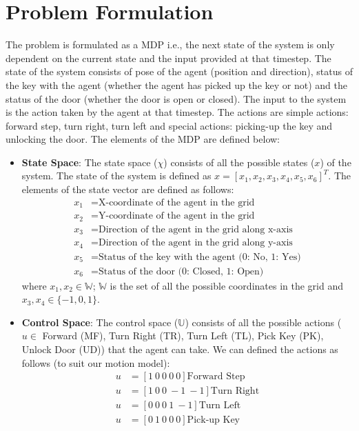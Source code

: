\documentclass[conference]{IEEEtran}
\begin{document}
\section{Problem Formulation}
The problem is formulated as a MDP i.e., the next state of the system is only dependent on the current state and the input provided at that timestep. The state of the system consists of pose of the agent (position and direction), status of the key with the agent (whether the agent has picked up the key or not) and the status of the door (whether the door is open or closed). The input to the system is the action taken by the agent at that timestep. The actions are simple actions: forward step, turn right, turn left and special actions: picking-up the key and unlocking the door. The elements of the MDP are defined below:
\begin{itemize}
\item \textbf{State Space}: The state space ($\chi$) consists of all the possible states ($x$) of the system. The state of the system is defined as $x = [x_1, x_2, x_3, x_4, x_5, x_6]^T$. The elements of the state vector are defined as follows:
\begin{align*}
x_1 &= \text{X-coordinate of the agent in the grid}\\
x_2 &= \text{Y-coordinate of the agent in the grid}\\
x_3 &= \text{Direction of the agent in the grid along x-axis}\\
x_4 &= \text{Direction of the agent in the grid along y-axis}\\
x_5 &= \text{Status of the key with the agent (0: No, 1: Yes)}\\
x_6 &= \text{Status of the door (0: Closed, 1: Open)}
\end{align*}
where $x_1, x_2 \in \mathbb{W}$; $\mathbb{W}$ is the set of all the possible coordinates in the grid and $x_3, x_4 \in \{-1, 0, 1\}$.
\item \textbf{Control Space}: The control space ($\mathbb{U}$) consists of all the possible actions ($u \in $ {Forward (MF), Turn Right (TR), Turn Left (TL), Pick Key (PK), Unlock Door (UD)}) that the agent can take. We can defined the actions as follows (to suit our motion model):
\begin{align*}
u &=[1 \ 0 \ 0 \ 0 \ 0] \text{Forward Step}\\
u &=[1 \ 0 \ 0 \ -1 \ -1] \text{Turn Right}\\
u &=[0 \ 0 \ 0 \ 1 \ -1] \text{Turn Left}\\
u &=[0 \ 1 \ 0 \ 0 \ 0] \text{Pick-up Key}\\

\end{align*}
\end{itemize}
\end{document}
